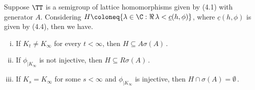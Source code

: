 \begin{theorem}\label{thm:b3-4.4}
	Suppose $\TT$ is a semigroup of lattice homomorphisms given by (4.1) with generator $A$.
	Considering $H \coloneq \{\lambda \in \C : \Re\,\lambda  < \underline{c}(h,\phi)\}$, where $\underline{c}(h,\phi)$ is given by (4.4), then we have.
	\begin{enumerate}[(i)]
		\item 
		If $K_{t} \neq K_{\infty}$ for every $t < \infty$, then $H \subseteq A\sigma(A)$\,.
	
		\item 
		If $\phi_{|K_{\infty}}$ is not injective, then $H \subseteq R\sigma(A)$\,.
	
		\item 
		If $K_{s} = K_{\infty}$ for some $s < \infty$ and $\phi_{|K_{\infty}}$ is injective, then $H\cap\sigma(A) = \emptyset$\,.
	\end{enumerate} 
\end{theorem}
